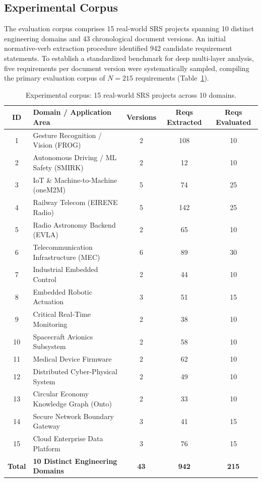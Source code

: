 \documentclass[journal]{IEEEtran}
\begin{document}
\subsection{Experimental Corpus}
\label{sec:corpus}

The evaluation corpus comprises 15 real-world SRS projects spanning 10 distinct engineering domains and 43 chronological document versions. An initial normative-verb extraction procedure identified 942 candidate requirement statements. To establish a standardized benchmark for deep multi-layer analysis, five requirements per document version were systematically sampled, compiling the primary evaluation corpus of $N=215$ requirements (Table~\ref{tab:corpus}).

\begin{table}[htbp]
\centering
\caption{Experimental corpus: 15 real-world SRS projects across 10 domains.}
\label{tab:corpus}
\small
\setlength{\tabcolsep}{3pt}
\begin{tabularx}{\columnwidth}{@{}c>{\raggedright\arraybackslash}Xccc@{}}
\toprule
\textbf{ID} & \textbf{Domain / Application Area} & \textbf{Versions} & \textbf{Reqs Extracted} & \textbf{Reqs Evaluated} \\
\midrule
1  & Gesture Recognition / Vision (FROG)       & 2 & 108 & 10 \\
2  & Autonomous Driving / ML Safety (SMIRK)   & 2 & 12  & 10 \\
3  & IoT \& Machine-to-Machine (oneM2M)        & 5 & 74  & 25 \\
4  & Railway Telecom (EIRENE Radio)             & 5 & 142 & 25 \\
5  & Radio Astronomy Backend (EVLA)             & 2 & 65  & 10 \\
6  & Telecommunication Infrastructure (MEC)    & 6 & 89  & 30 \\
7  & Industrial Embedded Control                & 2 & 44  & 10 \\
8  & Embedded Robotic Actuation                 & 3 & 51  & 15 \\
9  & Critical Real-Time Monitoring              & 2 & 38  & 10 \\
10 & Spacecraft Avionics Subsystem              & 2 & 58  & 10 \\
11 & Medical Device Firmware                    & 2 & 62  & 10 \\
12 & Distributed Cyber-Physical System           & 2 & 49  & 10 \\
13 & Circular Economy Knowledge Graph (Onto)     & 2 & 33  & 10 \\
14 & Secure Network Boundary Gateway             & 3 & 41  & 15 \\
15 & Cloud Enterprise Data Platform              & 3 & 76  & 15 \\
\midrule
\textbf{Total} & \textbf{10 Distinct Engineering Domains} & \textbf{43} & \textbf{942} & \textbf{215} \\
\bottomrule
\end{tabularx}
\end{table}
\end{document}

